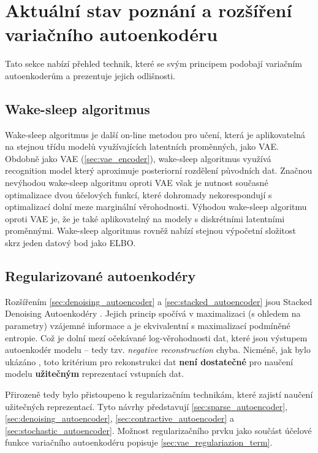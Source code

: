 \section{Aktuální stav poznání a rozšíření variačního autoenkodéru}
Tato sekce nabízí přehled technik, které se svým principem podobají variačním autoenkoderům a prezentuje jejich odlišnosti.
\subsection{Wake-sleep algoritmus}
Wake-sleep algoritmus \cite{Hinton1995} je další on-line metodou pro učení, která je aplikovatelná na stejnou třídu modelů využívajících latentních proměnných, jako VAE.
Obdobně jako VAE (\autoref{sec:vae_encoder}), wake-sleep algoritmus využívá recognition model který aproximuje posteriorní rozdělení původních dat.
Značnou nevýhodou wake-sleep algoritmu oproti VAE však je nutnost současné optimalizace dvou účelových funkcí, které dohromady nekorespondují s optimalizací dolní meze marginální věrohodnosti.
Výhodou wake-sleep algoritmu oproti VAE je, že je také aplikovatelný na modely s diskrétními latentními proměnnými.
Wake-sleep algoritmus rovněž nabízí stejnou výpočetní složitost skrz jeden datový bod jako ELBO. \cite{Kingma2019}

\subsection{Regularizované autoenkodéry}
Rozšířením \autoref{sec:denoising_autoencoder} a \autoref{sec:stacked_autoencoder} jsou Stacked Denoising Autoenkodéry \cite{Vincent2010}. Jejich princip spočívá v maximalizaci (s ohledem na parametry) vzájemné informace  a je ekvivalentní s maximalizací podmíněné entropie. Což je dolní mezí očekávané log-věrohodnosti dat, které jsou výstupem autoenkodér modelu – tedy tzv. \emph{negative reconstruction} chyba.
Nicméně, jak bylo ukázáno \cite{Bengio2014}, toto kritérium pro rekonstrukci dat \textbf{není dostatečné} pro naučení modelu \textbf{užitečným} reprezentací vstupních dat.

Přirozeně tedy bylo přistoupeno k regularizačním technikám, které zajistí naučení užitečných reprezentací. Tyto návrhy představují \autoref{sec:sparse_autoencoder}, \autoref{sec:denoising_autoencoder}, \autoref{sec:contractive_autoencoder} a \autoref{sec:stochastic_autoencoder}.
Možnost regularizačního prvku jako součást účelové funkce variačního autoenkodéru popisuje \autoref{sec:vae_regulariazion_term}.

